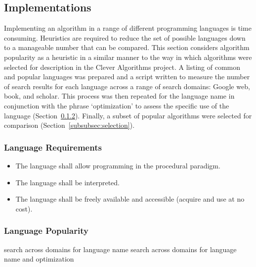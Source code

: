 \documentclass[a4paper, 11pt]{article}
\begin{document}
% 
% 
\subsection{Implementations}
Implementing an algorithm in a range of different programming languages is time consuming. Heuristics are required to reduce the set of possible languages down to a manageable number that can be compared.
This section considers algorithm popularity as a heuristic in a similar manner to the way in which algorithms were selected for description in the Clever Algorithms project. A listing of common and popular languages was prepared and a script written to measure the number of search results for each language across a range of search domains: Google web, book, and scholar. This process was then repeated for the language name in conjunction with the phrase `optimization' to assess the specific use of the language (Section~\ref{subsubsec:popularity}). Finally, a subset of popular algorithms were selected for comparison (Section~\ref{subsubsec:selection}).

\subsubsection{Language Requirements}
\label{subsubsec:requirements}

\begin{itemize}
	\item The language shall allow programming in the procedural paradigm.
	\item The language shall be interpreted.
	\item The language shall be freely available and accessible (acquire and use at no cost).
\end{itemize}

\subsubsection{Language Popularity}
\label{subsubsec:popularity}
search across domains for language name
search across domains for language name and optimization
\end{document}
